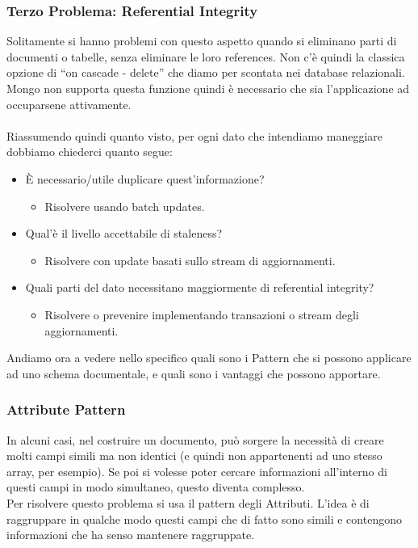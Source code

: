 \subsubsection{Terzo Problema: Referential Integrity}
Solitamente si hanno problemi con questo aspetto quando si eliminano parti di documenti o tabelle, senza eliminare le loro references. Non c'è quindi la classica opzione di ``on cascade - delete'' che diamo per scontata nei database relazionali. Mongo non supporta questa funzione quindi è necessario che sia l'applicazione ad occuparsene attivamente.\\\\

\noindent Riassumendo quindi quanto visto, per ogni dato che intendiamo maneggiare dobbiamo chiederci quanto segue:
\begin{itemize}
    \item È necessario/utile duplicare quest'informazione?
    \begin{itemize}
        \item Risolvere usando batch updates.
    \end{itemize}
    \item Qual'è il livello accettabile di staleness?
    \begin{itemize}
        \item Risolvere con update basati sullo stream di aggiornamenti.
    \end{itemize}
    \item Quali parti del dato necessitano maggiormente di referential integrity?
    \begin{itemize}
        \item Risolvere o prevenire implementando transazioni o stream degli aggiornamenti.
    \end{itemize}
\end{itemize}

\noindent Andiamo ora a vedere nello specifico quali sono i Pattern che si possono applicare ad uno schema documentale, e quali sono i vantaggi che possono apportare.

\subsubsection{Attribute Pattern}
In alcuni casi, nel costruire un documento, può sorgere la necessità di creare molti campi simili ma non identici (e quindi non appartenenti ad uno stesso array, per esempio). Se poi si volesse poter cercare informazioni all'interno di questi campi in modo simultaneo, questo diventa complesso.\\
Per risolvere questo problema si usa il pattern degli Attributi. L'idea è di raggruppare in qualche modo questi campi che di fatto sono simili e contengono informazioni che ha senso mantenere raggruppate.\\

